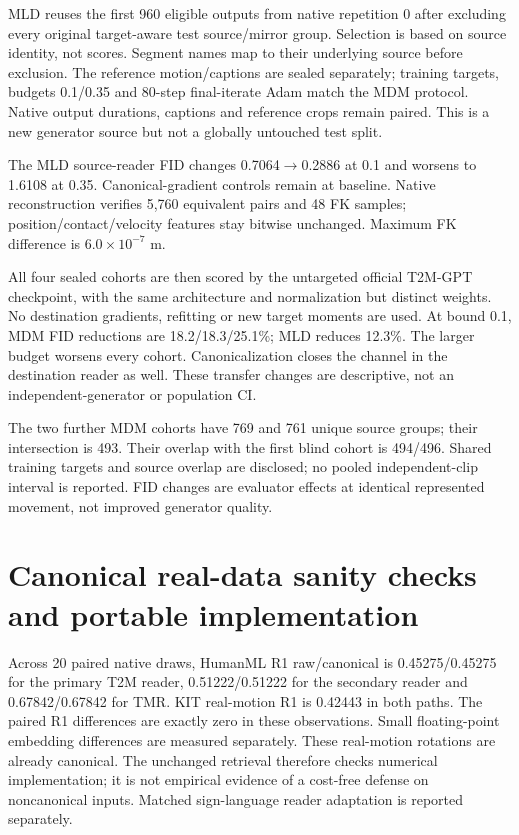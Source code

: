 \documentclass[10pt,twocolumn,letterpaper]{article}
\begin{document}

MLD reuses the first 960 eligible outputs from native repetition 0 after excluding every original target-aware test source/mirror group. Selection is based on source identity, not scores. Segment names map to their underlying source before exclusion. The reference motion/captions are sealed separately; training targets, budgets 0.1/0.35 and 80-step final-iterate Adam match the MDM protocol. Native output durations, captions and reference crops remain paired. This is a new generator source but not a globally untouched test split.

The MLD source-reader FID changes 0.7064$\to$0.2886 at 0.1 and worsens to 1.6108 at 0.35. Canonical-gradient controls remain at baseline. Native reconstruction verifies 5,760 equivalent pairs and 48 FK samples; position/contact/velocity features stay bitwise unchanged. Maximum FK difference is $6.0\times 10^{-7}$ m.

All four sealed cohorts are then scored by the untargeted official T2M-GPT checkpoint, with the same architecture and normalization but distinct weights. No destination gradients, refitting or new target moments are used. At bound 0.1, MDM FID reductions are 18.2/18.3/25.1\%; MLD reduces 12.3\%. The larger budget worsens every cohort. Canonicalization closes the channel in the destination reader as well. These transfer changes are descriptive, not an independent-generator or population CI.

The two further MDM cohorts have 769 and 761 unique source groups; their intersection is 493. Their overlap with the first blind cohort is 494/496. Shared training targets and source overlap are disclosed; no pooled independent-clip interval is reported. FID changes are evaluator effects at identical represented movement, not improved generator quality.


\section{Canonical real-data sanity checks and portable implementation}

Across 20 paired native draws, HumanML R1 raw/canonical is 0.45275/0.45275 for the primary T2M reader, 0.51222/0.51222 for the secondary reader and 0.67842/0.67842 for TMR. KIT real-motion R1 is 0.42443 in both paths. The paired R1 differences are exactly zero in these observations. Small floating-point embedding differences are measured separately. These real-motion rotations are already canonical. The unchanged retrieval therefore checks numerical implementation; it is not empirical evidence of a cost-free defense on noncanonical inputs. Matched sign-language reader adaptation is reported separately.
\end{document}
